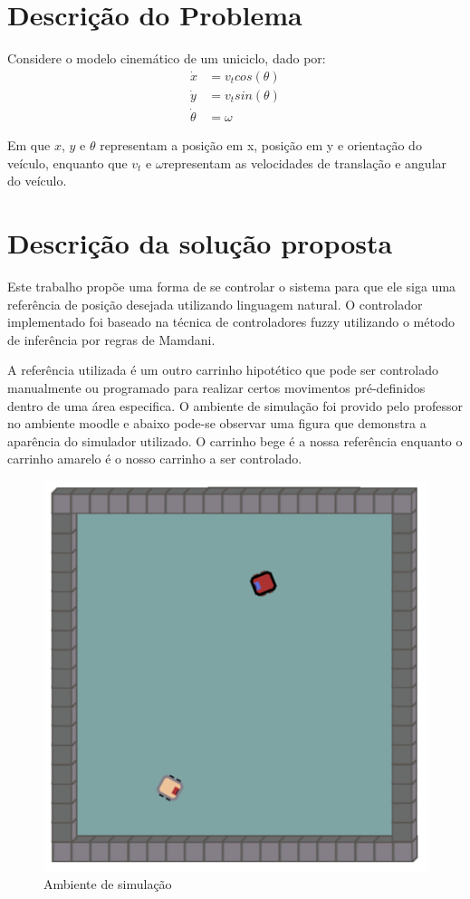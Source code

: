 \graphicspath{ {./imagens/} }

\section{Descrição do Problema}
Considere o modelo cinemático de um uniciclo, dado por:
    \begin{align*}
            \dot{x} &= v_t cos(\theta)\\
            \dot{y} &= v_t sin(\theta)\\
            \dot{\theta} &= \omega
    \end{align*}

Em que $x$, $y$ e $\theta$ representam a posição em x, posição em y e orientação do veículo, enquanto
que $v_t$ e $\omega$representam as velocidades de translação e angular do veículo.

\section{Descrição da solução proposta}

Este trabalho propõe uma forma de se controlar o sistema para que ele siga uma referência de posição desejada utilizando linguagem natural. O controlador implementado foi baseado na técnica de controladores fuzzy utilizando o método de inferência por regras de Mamdani. 

A referência utilizada é um outro carrinho hipotético que pode ser controlado manualmente ou programado para realizar certos movimentos pré-definidos dentro de uma área especifica. O ambiente de simulação foi provido pelo professor no ambiente moodle e abaixo pode-se observar uma figura que demonstra a aparência do simulador utilizado. O carrinho bege é a nossa referência enquanto o carrinho amarelo é o nosso carrinho a ser controlado.

\begin{figure}[H] 
    \centering
    \includegraphics[scale=0.5]{carrinho_base.png}
    \caption{Ambiente de simulação}
\end{figure}
 
